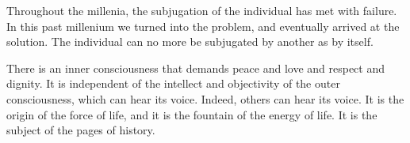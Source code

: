 

Throughout the millenia, the subjugation of the individual has met
with failure.  In this past millenium we turned into the problem, and
eventually arrived at the solution.  The individual can no more be
subjugated by another as by itself.  

There is an inner consciousness that demands peace and love and
respect and dignity.  It is independent of the intellect and
objectivity of the outer consciousness, which can hear its voice.
Indeed, others can hear its voice.  It is the origin of the force of
life, and it is the fountain of the energy of life.  It is the subject
of the pages of history.

\bye

